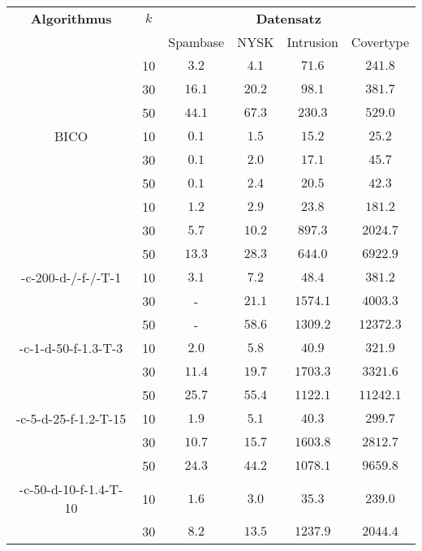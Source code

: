 \begin{table}[h]
\centering
\begin{tabular}{@{}cccccc@{}} \toprule
	\textbf{Algorithmus} & $k$ & \multicolumn{4}{c}{\textbf{Datensatz}} \\
	\cmidrule(r){3-6} & 		& Spambase 				& NYSK 				& Intrusion 			& Covertype \\ \toprule
	\Skmpp 						& 10 & $3.2$ 			& $4.1$ 			& $71.6$ 				& $241.8$ \\
		 						& 30 & $16.1$ 			& $20.2$ 			& $98.1$ 				& $381.7$ \\
		 						& 50 & $44.1$ 			& $67.3$ 			& $230.3$ 				& $529.0$ \\
	\midrule
	BICO 						& 10 & $0.1$ 			& $1.5$ 			& $15.2$ 				& $25.2$ \\
			 					& 30 & $0.1$ 			& $2.0$ 			& $17.1$ 				& $45.7$ \\
		 						& 50 & $0.1$ 			& $2.4$ 			& $20.5$ 				& $42.3$ \\
	\midrule
	\kmpp 						& 10 & $1.2$ 			& $2.9$ 			& $23.8$ 				& $181.2$ \\
			 					& 30 & $5.7$ 			& $10.2$ 			& $897.3$ 				& $2024.7$ \\
		 						& 50 & $13.3$ 			& $28.3$ 			& $644.0$ 				& $6922.9$ \\
	\midrule
	\CsTwo-c-200-d-/-f-/-T-1	& 10 & $3.1$			& $7.2$				& $48.4$ 				& $381.2$ \\
			 					& 30 & - 				& $21.1$			& $1574.1$ 				& $4003.3$ \\
		 						& 50 & - 				& $58.6$			& $1309.2$ 				& $12372.3$ \\
	\midrule
	\CsTwo-c-1-d-50-f-1.3-T-3	& 10 & $2.0$ 			& $5.8$ 			& $40.9$ 				& $321.9$ \\
			 					& 30 & $11.4$ 			& $19.7$ 			& $1703.3$ 				& $3321.6$ \\
		 						& 50 & $25.7$ 			& $55.4$ 			& $1122.1$ 				& $11242.1$ \\
	\midrule
	\CsTwo-c-5-d-25-f-1.2-T-15	& 10 & $1.9$ 			& $5.1$ 			& $40.3$ 				& $299.7$ \\
			 					& 30 & $10.7$ 			& $15.7$ 			& $1603.8$ 				& $2812.7$ \\
		 						& 50 & $24.3$ 			& $44.2$ 			& $1078.1$ 				& $9659.8$ \\
	\midrule
	\CsTwo-c-50-d-10-f-1.4-T-10	& 10 & $1.6$ 			& $3.0$ 			& $35.3$ 				& $239.0$ \\
			 					& 30 & $8.2$ 			& $13.5$ 			& $1237.9$ 				& $2044.4$ \\

\end{tabular}
\end{table}
